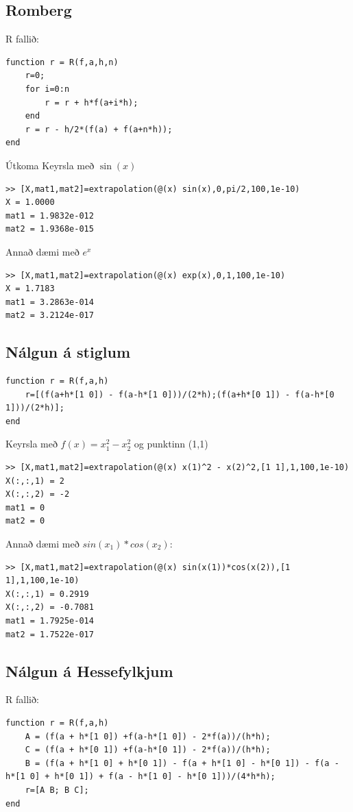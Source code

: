 \documentclass[a4]{article}
\begin{document}
\subsection{Romberg}
R fallið:
\begin{lstlisting}
function r = R(f,a,h,n)
    r=0;
    for i=0:n
        r = r + h*f(a+i*h);
    end
    r = r - h/2*(f(a) + f(a+n*h));
end
\end{lstlisting}
Útkoma
Keyrsla með $\sin(x)$
\begin{lstlisting}
>> [X,mat1,mat2]=extrapolation(@(x) sin(x),0,pi/2,100,1e-10)
X = 1.0000
mat1 = 1.9832e-012
mat2 = 1.9368e-015
\end{lstlisting}  
Annað dæmi með $e^x$
\begin{lstlisting}
>> [X,mat1,mat2]=extrapolation(@(x) exp(x),0,1,100,1e-10)
X = 1.7183
mat1 = 3.2863e-014
mat2 = 3.2124e-017
\end{lstlisting}

\subsection{Nálgun á stiglum}
\begin{lstlisting}
function r = R(f,a,h)
    r=[(f(a+h*[1 0]) - f(a-h*[1 0]))/(2*h);(f(a+h*[0 1]) - f(a-h*[0 1]))/(2*h)];
end
\end{lstlisting}

Keyrsla með $f(x) = x^2_1 - x^2_2$ og punktinn (1,1)
\begin{lstlisting}
>> [X,mat1,mat2]=extrapolation(@(x) x(1)^2 - x(2)^2,[1 1],1,100,1e-10)
X(:,:,1) = 2
X(:,:,2) = -2
mat1 = 0
mat2 = 0
\end{lstlisting}

Annað dæmi með $sin(x_1)*cos(x_2)$:
\begin{lstlisting}
>> [X,mat1,mat2]=extrapolation(@(x) sin(x(1))*cos(x(2)),[1 1],1,100,1e-10)
X(:,:,1) = 0.2919
X(:,:,2) = -0.7081
mat1 = 1.7925e-014
mat2 = 1.7522e-017 
\end{lstlisting}

\subsection{Nálgun á Hessefylkjum}

R fallið:
\begin{lstlisting}
function r = R(f,a,h)
    A = (f(a + h*[1 0]) +f(a-h*[1 0]) - 2*f(a))/(h*h);
    C = (f(a + h*[0 1]) +f(a-h*[0 1]) - 2*f(a))/(h*h);
    B = (f(a + h*[1 0] + h*[0 1]) - f(a + h*[1 0] - h*[0 1]) - f(a - h*[1 0] + h*[0 1]) + f(a - h*[1 0] - h*[0 1]))/(4*h*h);
    r=[A B; B C];
end
\end{lstlisting}
\end{document}
